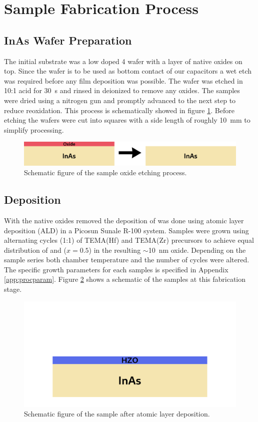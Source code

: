 \documentclass[11pt,twoside,final]{eitExjobb}  %
\begin{document}
\section{Sample Fabrication Process}\label{sec:FabProc}

\subsection{InAs Wafer Preparation}
The initial substrate was a low doped  \SI{4}{\inch} wafer with a
layer of native oxides on top. Since the wafer is to be used as
bottom contact of our capacitors a wet etch was required before any film
deposition was possible. The wafer was etched in 10:1  acid for
\SI{30}{\second} and rinsed in deionized  to remove any oxides. The
samples were dried using a nitrogen gun and promptly advanced to the next step
to reduce reoxidation. This process is schematically showed in figure
\ref{fig:fab_1}. Before etching the wafers were cut into squares with a side
length of roughly \SI{10}{\milli\meter} to simplify processing.

\begin{figure}[htbp]
    \centering
    \includegraphics[width=.70\linewidth]{fig/fabproc/fab_1.png}
    \caption{Schematic figure of the sample oxide etching process.}\label{fig:fab_1}
\end{figure}

\subsection{ Deposition}
With the native  oxides removed the deposition of 
was done using atomic layer deposition (ALD) in a Picosun Sunale R-100 system.
Samples were grown using alternating cycles (1:1) of TEMA(Hf) and TEMA(Zr)
precursors to achieve equal distribution of  and  ($x=0.5$) in
the resulting $\sim$\SI{10}{\nano\meter} oxide. Depending on the sample series
both chamber temperature and the number of cycles were altered. The specific
growth parameters for each samples is specified in Appendix \ref{app:procparam}.
Figure \ref{fig:fab_2} shows a schematic of the samples at this fabrication
stage.

\begin{figure}[htbp]
    \centering
    \includegraphics[width=.45\linewidth]{fig/fabproc/fab_2.png}
    \caption{Schematic figure of the sample after atomic layer
    deposition.}\label{fig:fab_2}
\end{figure}
\end{document}
